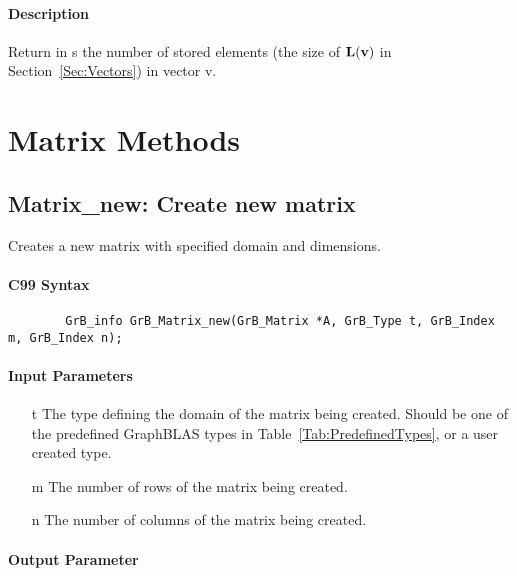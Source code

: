 \paragraph{Description}

Return in {\sf s} the number of stored elements (the size of $\bold{L}({\bf v})$
in Section~\ref{Sec:Vectors}) in vector {\sf v}.


\section{Matrix Methods}

\subsection{{\sf Matrix\_new}: Create new matrix}

Creates a new matrix with specified domain and dimensions.

\paragraph{C99 Syntax}

\begin{verbatim}
        GrB_info GrB_Matrix_new(GrB_Matrix *A, GrB_Type t, GrB_Index m, GrB_Index n);
\end{verbatim}

\paragraph{Input Parameters}

\begin{itemize}[leftmargin=1.1in]
    \item[{\sf t}] The type defining the domain of the matrix being created. Should be one of the predefined
    GraphBLAS types in Table~\ref{Tab:PredefinedTypes}, or a user created type.
    \item[{\sf m}] The number of rows of the matrix being created.
    \item[{\sf n}] The number of columns of the matrix being created.
\end{itemize}

\paragraph{Output Parameter}


